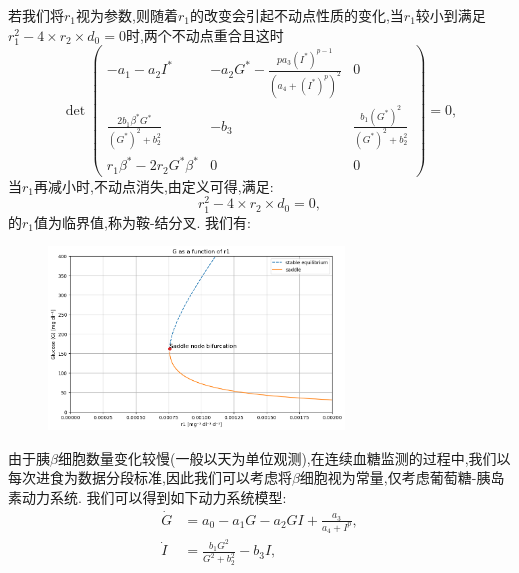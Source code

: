     若我们将$r_1$视为参数,则随着$r_1$的改变会引起不动点性质的变化,当$r_1$较小到满足$r_1^2-4\times r_2\times d_0=0$时,两个不动点重合且这时
    \begin{equation}
        \det \begin{pmatrix}
        -a_1-a_2I^*                            & -a_2G^*-\frac{pa_3(I^*)^{p-1}}{(a_4+(I^*)^p)^2} & 0                                  \\
        \frac{2b_1\beta^*G^*}{(G^*)^2 + b_2^2} & -b_3                                            & \frac{b_1(G^*)^2}{(G^*)^2 + b_2^2} \\
        r_1\beta^*-2r_2G^*\beta^*              & 0                                               & 0
    \end{pmatrix}=0,
    \end{equation}
    当$r_1$再减小时,不动点消失,由定义可得,满足:
    \begin{equation}
        r_1^2-4\times r_2\times d_0=0,
    \end{equation}
    的$r_1$值为临界值,称为鞍-结分叉. 
我们有:

\begin{figure}[H]
    \centering
    \includegraphics[width=0.7\textwidth]{Img/betadynamic.png}
    \label{fig:bifurcation}
\end{figure}

由于胰$\beta$细胞数量变化较慢(一般以天为单位观测),在连续血糖监测的过程中,我们以每次进食为数据分段标准,因此我们可以考虑将$\beta$细胞视为常量,仅考虑葡萄糖-胰岛素动力系统\cite{huard2022mathematical}. 我们可以得到如下动力系统模型:
\begin{equation}\label{11}
    \begin{aligned}
        \dot{G} & = a_0-a_1G-a_2GI+\frac{a_3}{a_4+I^p},  \\
        \dot{I} & = \frac{b_1 G^2}{G^2 + b_2^2} - b_3 I,
    \end{aligned}
\end{equation}

